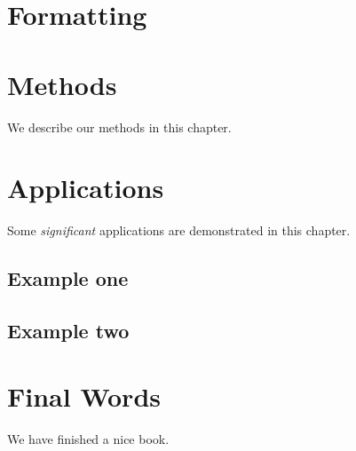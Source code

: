 \documentclass[]{book}
\begin{document}
\hypertarget{formatting}{%
\chapter{Formatting}\label{formatting}}

\hypertarget{methods}{%
\chapter{Methods}\label{methods}}

We describe our methods in this chapter.

\hypertarget{applications}{%
\chapter{Applications}\label{applications}}

Some \emph{significant} applications are demonstrated in this chapter.

\hypertarget{example-one}{%
\section{Example one}\label{example-one}}

\hypertarget{example-two}{%
\section{Example two}\label{example-two}}

\hypertarget{final-words}{%
\chapter{Final Words}\label{final-words}}

We have finished a nice book.


\end{document}
